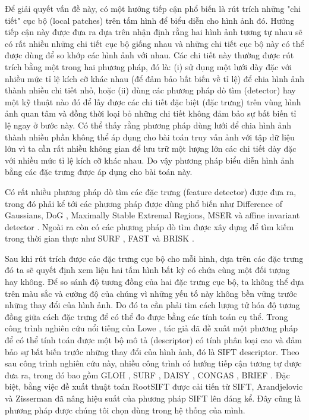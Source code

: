 Để giải quyết vấn đề này, có một hướng tiếp cận phổ biến là rút trích những "chi tiết" cục bộ (local patches) trên tấm hình để biểu diễn cho hình ảnh đó. Hướng tiếp cận này được đưa ra dựa trên nhận định rằng hai hình ảnh tương tự nhau sẽ có rất nhiều những chi tiết cục bộ giống nhau và những chi tiết cục bộ này có thể được dùng để so khớp các hình ảnh với nhau. Các chi tiết này thường được rút trích bằng một trong hai phương pháp, đó là: (i) sử dụng một lưới dày đặc với nhiều mức tỉ lệ kích cỡ khác nhau (để đảm bảo bất biến về tỉ lệ) để chia hình ảnh thành nhiều chi tiết nhỏ, hoặc (ii) dùng các phương pháp dò tìm (detector) hay một kỹ thuật nào đó để lấy được các chi tiết đặc biệt (đặc trưng) trên vùng hình ảnh quan tâm và đồng thời loại bỏ những chi tiết không đảm bảo sự bất biến tỉ lệ ngay ở bước này. Có thể thấy rằng phương pháp dùng lưới để chia hình ảnh thành nhiều phần không thể áp dụng cho bài toán truy vấn ảnh với tập dữ liệu lớn vì ta cần rất nhiều không gian để lưu trữ một lượng lớn các chi tiết dày đặc với nhiều mức tỉ lệ kích cỡ khác nhau. Do vậy phương pháp biểu diễn hình ảnh bằng các đặc trưng được áp dụng cho bài toán này.

Có rất nhiều phương pháp dò tìm các đặc trưng (feature detector) được đưa ra, trong đó phải kể tới các phương pháp được dùng phổ biến như Difference of Gaussians, DoG \cite{lowe2004distinctive}, Maximally Stable Extremal Regions, MSER \cite{matas2004robust} và affine invariant detector \cite{mikolajczyk2004scale}. Ngoài ra còn có các phương pháp dò tìm được xây dựng để tìm kiếm trong thời gian thực như SURF \cite{bay2006surf}, FAST \cite{rosten2010faster} và BRISK \cite{leutenegger2011brisk}.

Sau khi rút trích được các đặc trưng cục bộ cho mỗi hình, dựa trên các đặc trưng đó ta sẽ quyết định xem liệu hai tấm hình bất kỳ có chứa cùng một đối tượng hay không. Để so sánh độ tương đồng của hai đặc trưng cục bộ, ta không thể dựa trên màu sắc và cường độ của chúng vì những yếu tố này không bền vững trước những thay đổi của hình ảnh. Do đó ta cần phải tìm cách lượng tử hóa độ tương đồng giữa cách đặc trưng để có thể đo được bằng các tính toán cụ thể. Trong công trình nghiên cứu nổi tiếng của Lowe \cite{lowe2004distinctive}, tác giả đã đề xuất một phương pháp để có thể tính toán được một bộ mô tả (descriptor) có tính phân loại cao và đảm bảo sự bất biến trước những thay đổi của hình ảnh, đó là SIFT descriptor. Theo sau công trình nghiên cứu này, nhiều công trình có hướng tiếp cận tương tự được đưa ra, trong đó bao gồm GLOH \cite{mikolajczyk2005performance}, SURF \cite{bay2006surf}, DAISY \cite{tola2008fast}, CONGAS \cite{zheng2009tour}, BRIEF \cite{calonder2010brief}. Đặc biệt, bằng việc đề xuất thuật toán RootSIFT được cải tiến từ SIFT, Arandjelovic và Zisserman \cite{arandjelovic2012three} đã nâng hiệu suất của phương pháp SIFT lên đáng kể. Đây cũng là phương pháp được chúng tôi chọn dùng trong hệ thống của mình.

